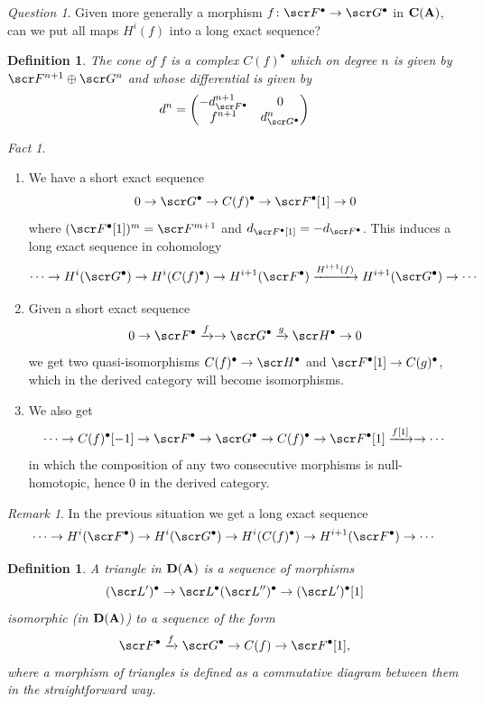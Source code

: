 \documentclass[A4paper, british]{amsart}
\theoremstyle{darkgreentheorem}
\theoremstyle{darkbluedefinition}
\newtheorem{defn}[thm]{Definition}
\theoremstyle{darkredexample}
\theoremstyle{remark}
\newtheorem{rem}[thm]{Remark}
\newtheorem{fact}[thm]{Fact}
\newtheorem{q}[thm]{Question}
\newcommand{\1}{\mathbbm{1}}
\newcommand{\op}{\oplus}
\newcommand{\grd}{^{\bullet}}
\begin{document}
\begin{q}
    Given more generally a morphism $f\colon \F\grd\to \G\grd$ in $\mathbf{C}(\mathbf{A})$, can we put all maps $H^{i}(f)$ into a long exact sequence?
\end{q}

\begin{defn}
    The \textit{cone of $f$} is a complex $C(f)\grd$ which on degree $n$ is given by $\F^{n+1}\op \G^{n}$ and whose differential is given by
    \[ d^{n}=\begin{pmatrix} -d_{\F\grd}^{n+1} & 0 \\ f^{n+1} & d_{\G\grd}^{n} \end{pmatrix} \]
\end{defn}

\begin{fact}
    \begin{enumerate}
	\item We have a short exact sequence
	    \[ 0\to \G\grd\to C(f)\grd \to \F\grd[1] \to 0 \]
	    where $(\F\grd[1])^{m}=\F^{m+1}$ and $d_{\F\grd[1]}=-d_{\F\grd}$.
	    This induces a long exact sequence in cohomology
	    \[ \cdots \to H^{i}(\G\grd)\to H^{i}(C(f)\grd)\to H^{i+1}(\F\grd)\xrightarrow{H^{i+1}(f)} H^{i+1}(\G\grd)\to \cdots \]
	\item Given a short exact sequence
	    \[ 0\to \F\grd\xrightarrow{f}\to \G\grd\xrightarrow{g} \sH\grd \to 0 \]
	    we get two quasi-isomorphisms $C(f)\grd\to \sH\grd$ and $\F\grd[1]\to C(g)\grd$, which in the derived category will become isomorphisms.
	\item We also get
	    \[ \cdots \to C(f)\grd[-1]\to \F\grd\to \G\grd \to C(f)\grd\to \F\grd[1]\xrightarrow{f[1]}\to \cdots \]
	    in which the composition of any two consecutive morphisms is null-homotopic, hence $0$ in the derived category.
    \end{enumerate}
\end{fact}

\begin{rem}
    In the previous situation we get a long exact sequence
    \[ \cdots \to H^{i}(\F\grd)\to H^{i}(\G\grd)\to H^{i}(C(f)\grd)\to H^{i+1}(\F\grd)\to \cdots \]
\end{rem}

\begin{defn}
    A \textit{triangle} in $\mathbf{D}(\mathbf{A})$ is a sequence of morphisms
    \[ (\L')\grd\to \L\grd (\L'')\grd\to (\L')\grd[1] \]
    isomorphic (in $\mathbf{D}(\mathbf{A})$) to a sequence of the form
    \[ \F\grd\xrightarrow{f} \G\grd\to C(f)\to \F\grd[1], \]
    where a morphism of triangles is defined as a commutative diagram between them in the straightforward way.
\end{defn}
\end{document}
